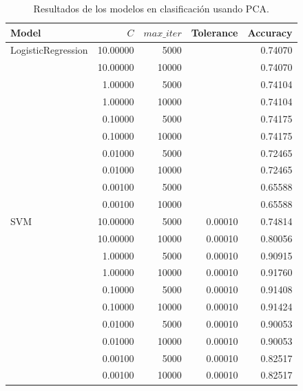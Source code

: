 \documentclass[a4paper, 20pt]{article}
\begin{document}
\begin{table}[H]
  \centering
\begin{tabular}{lrrrr}
Model              & $C$      & $max\_iter$ & Tolerance & Accuracy \\ \hline
LogisticRegression & 10.00000 & 5000        &           & 0.74070  \\
                   & 10.00000 & 10000       &           & 0.74070  \\
                   & 1.00000  & 5000        &           & 0.74104  \\
                   & 1.00000  & 10000       &           & 0.74104  \\
                   & 0.10000  & 5000        &           & 0.74175  \\
                   & 0.10000  & 10000       &           & 0.74175  \\
                   & 0.01000  & 5000        &           & 0.72465  \\
                   & 0.01000  & 10000       &           & 0.72465  \\
                   & 0.00100  & 5000        &           & 0.65588  \\
                   & 0.00100  & 10000       &           & 0.65588  \\
SVM                & 10.00000 & 5000        & 0.00010   & 0.74814  \\
                   & 10.00000 & 10000       & 0.00010   & 0.80056  \\
                   & 1.00000  & 5000        & 0.00010   & 0.90915  \\
                   & 1.00000  & 10000       & 0.00010   & 0.91760  \\
                   & 0.10000  & 5000        & 0.00010   & 0.91408  \\
                   & 0.10000  & 10000       & 0.00010   & 0.91424  \\
                   & 0.01000  & 5000        & 0.00010   & 0.90053  \\
                   & 0.01000  & 10000       & 0.00010   & 0.90053  \\
                   & 0.00100  & 5000        & 0.00010   & 0.82517  \\
                   & 0.00100  & 10000       & 0.00010   & 0.82517 
\end{tabular}
\caption{Resultados de los modelos en clasificación usando PCA.}
\end{table}
\end{document}
